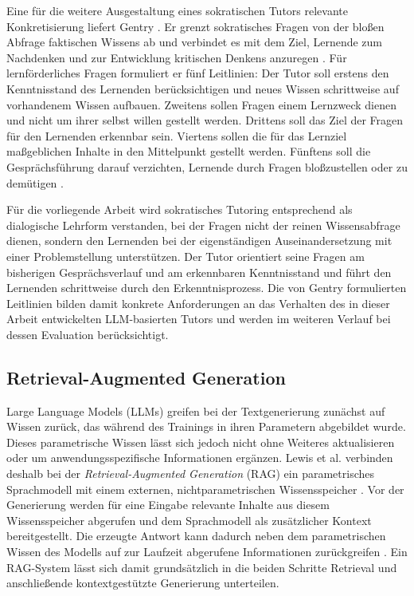 Eine für die weitere Ausgestaltung eines sokratischen Tutors relevante Konkretisierung liefert Gentry \cite{Gentry2015}. Er grenzt sokratisches Fragen von der bloßen Abfrage faktischen Wissens ab und verbindet es mit dem Ziel, Lernende zum Nachdenken und zur Entwicklung kritischen Denkens anzuregen \cite{Gentry2015}. Für lernförderliches Fragen formuliert er fünf Leitlinien: Der Tutor soll erstens den Kenntnisstand des Lernenden berücksichtigen und neues Wissen schrittweise auf vorhandenem Wissen aufbauen. Zweitens sollen Fragen einem Lernzweck dienen und nicht um ihrer selbst willen gestellt werden. Drittens soll das Ziel der Fragen für den Lernenden erkennbar sein. Viertens sollen die für das Lernziel maßgeblichen Inhalte in den Mittelpunkt gestellt werden. Fünftens soll die Gesprächsführung darauf verzichten, Lernende durch Fragen bloßzustellen oder zu demütigen \cite{Gentry2015}.
 
Für die vorliegende Arbeit wird sokratisches Tutoring entsprechend als dialogische Lehrform verstanden, bei der Fragen nicht der reinen Wissensabfrage dienen, sondern den Lernenden bei der eigenständigen Auseinandersetzung mit einer Problemstellung unterstützen. Der Tutor orientiert seine Fragen am bisherigen Gesprächsverlauf und am erkennbaren Kenntnisstand und führt den Lernenden schrittweise durch den Erkenntnisprozess. Die von Gentry formulierten Leitlinien bilden damit konkrete Anforderungen an das Verhalten des in dieser Arbeit entwickelten LLM-basierten Tutors und werden im weiteren Verlauf bei dessen Evaluation berücksichtigt.
 
\subsection{Retrieval-Augmented Generation}
\label{subsec:rag}
 
Large Language Models (LLMs) greifen bei der Textgenerierung zunächst auf Wissen zurück, das während des Trainings in ihren Parametern abgebildet wurde. Dieses parametrische Wissen lässt sich jedoch nicht ohne Weiteres aktualisieren oder um anwendungsspezifische Informationen ergänzen. Lewis et al. verbinden deshalb bei der \textit{Retrieval-Augmented Generation} (RAG) ein parametrisches Sprachmodell mit einem externen, nichtparametrischen Wissensspeicher \cite{Lewis2020RAG}. Vor der Generierung werden für eine Eingabe relevante Inhalte aus diesem Wissensspeicher abgerufen und dem Sprachmodell als zusätzlicher Kontext bereitgestellt. Die erzeugte Antwort kann dadurch neben dem parametrischen Wissen des Modells auf zur Laufzeit abgerufene Informationen zurückgreifen \cite{Lewis2020RAG}. Ein RAG-System lässt sich damit grundsätzlich in die beiden Schritte Retrieval und anschließende kontextgestützte Generierung unterteilen.
 
